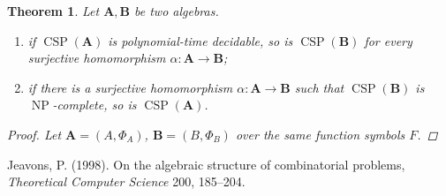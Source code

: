 \documentclass{amsart}
\theoremstyle{plain}
\newtheorem{theorem}{Theorem}[section]
\theoremstyle{definition}
\theoremstyle{remark}
\DeclareMathOperator{\CSP}{CSP}
\DeclareMathOperator{\NP}{NP}
\begin{document}
\begin{theorem}
    Let $\mathbf{A}, \mathbf{B}$ be two algebras. 
    \begin{enumerate}
        \item if $\CSP(\mathbf{A})$ is polynomial-time decidable, so is $\CSP(\mathbf{B})$ for every surjective homomorphism $\alpha: \mathbf{A} \to \mathbf{B}$; 
        \item if there is a surjective homomorphism $\alpha: \mathbf{A} \to \mathbf{B}$ such that $\CSP(\mathbf{B})$ is $\NP$-complete, so is $\CSP(\mathbf{A})$. 
    \end{enumerate}
    \begin{proof}
        Let $\mathbf{A}=(A, \Phi_A)$, $\mathbf{B}=(B, \Phi_B)$ over the same function symbols $F$. 
        
    \end{proof}
\end{theorem}


\begin{thebibliography}{9}
    
       Jeavons, P. (1998). On the algebraic structure of combinatorial problems, \emph{Theoretical Computer Science} 200, 185–204.
 \end{thebibliography}
\end{document}
